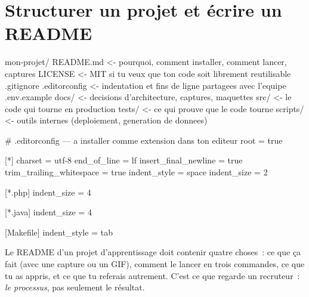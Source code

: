 \section{Structurer un projet et \'ecrire un README}

\begin{codeplain}
mon-projet/
  README.md            <- pourquoi, comment installer, comment lancer, captures
  LICENSE              <- MIT si tu veux que ton code soit librement reutilisable
  .gitignore
  .editorconfig        <- indentation et fins de ligne partagees avec l'equipe
  .env.example
  docs/                <- decisions d'architecture, captures, maquettes
  src/                 <- le code qui tourne en production
  tests/               <- ce qui prouve que le code tourne
  scripts/             <- outils internes (deploiement, generation de donnees)
\end{codeplain}

\begin{codeconf}
# .editorconfig --- a installer comme extension dans ton editeur
root = true

[*]
charset = utf-8
end_of_line = lf
insert_final_newline = true
trim_trailing_whitespace = true
indent_style = space
indent_size = 2

[*.php]
indent_size = 4

[*.java]
indent_size = 4

[Makefile]
indent_style = tab
\end{codeconf}

Le README d'un projet d'apprentissage doit contenir quatre choses~: ce que \c{c}a fait
(avec une capture ou un GIF), comment le lancer en trois commandes, ce que tu as appris,
et ce que tu referais autrement. C'est ce que regarde un recruteur~: \emph{le processus},
pas seulement le r\'esultat.

\begin{exercice}
\end{exercice}

